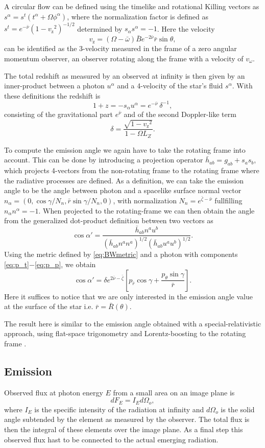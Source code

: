 \documentclass[iop, usenatbib]{emulateapj}
\newcommand{\be}{\begin{equation}}
\newcommand{\ee}{\end{equation}}
\newcommand{\rb}{\ensuremath{\bar{r}}}
\newcommand{\wb}{\ensuremath{\bar{\omega}}}
\newcommand{\nub}{\ensuremath{\bar{\nu}}}
\newcommand{\zetab}{\ensuremath{\bar{\zeta}}}
\newcommand{\Bb}{\ensuremath{\bar{B}}}
\newcommand{\vw}{\ensuremath{v_{\omega}}}
\newcommand{\vz}{\ensuremath{v_{\mathrm{z}}}}
\begin{document}
A circular flow can be defined using the timelike and rotational Killing vectors as $s^{\alpha} = s^t (t^{\alpha} + \Omega \phi^{\alpha})$, where the normalization factor is defined as $s^t = e^{-\nub} (1 - \vz^2)^{-1/2}$ determined by $s_{\alpha}s^{\alpha} = -1$.
Here the velocity 
\be
\vz = (\Omega - \wb) \Bb e^{-2\nub} \rb \sin\theta,
\ee
can be identified as the 3-velocity measured in the frame of a zero angular momentum observer, an observer rotating along the frame with a velocity of $\vw$.

The total redshift as measured by an observed at infinity is then given by an inner-product between a photon $u^{\alpha}$ and a 4-velocity of the star's fluid $s^{\alpha}$.
With these definitions the redshift is
\be
1 + z = -s_{\alpha} u^{\alpha} = e^{-\nub} ~\delta^{-1},
\ee
consisting of the gravitational part $e^{\nub}$ and of the second Doppler-like term
\be
\delta = \frac{\sqrt{1-\vz^2}}{1 - \Omega L_Z}.
\ee

To compute the emission angle we again have to take the rotating frame into account.  
This can be done by introducing a projection operator $\bar{h}_{ab} = g_{ab} + s_a s_b$, which projects 4-vectors from the non-rotating frame to the rotating frame where the radiative processes are defined.  
As a definition, we can take the emission angle to be the angle between photon and a spacelike surface normal vector $n_{\alpha} = (0, \cos\gamma/N_n, \rb \sin\gamma/N_n, 0)$, with normalization $N_n = e^{\zetab - \nub}$ fullfilling $n_{\alpha}n^{\alpha} = -1$.  
When projected to the rotating-frame we can then obtain the angle from the generalized dot-product definition between two vectors as
\be\label{eq:gen_angle}
\cos\alpha' = \frac{\bar{h}_{ab}n^a u^b}{(\bar{h}_{ab} n^a n^a)^{1/2} (\bar{h}_{ab} u^a u^b)^{1/2}}.
\ee
Using the metric defined by \eqref{eq:BWmetric} and a photon with components \eqref{eq:p_t}$-$\eqref{eq:p_p}, we obtain
\be
\cos\alpha' = \delta e^{2\nub-\zetab} \left[ p_{\rb} \cos\gamma + \frac{p_{\theta} \sin\gamma}{\rb} \right].
\ee
Here it suffices to notice that we are only interested in the emission angle value at the surface of the star i.e. $\rb = \bar{R}(\theta)$.

The result here is similar to the emission angle obtained with a special-relativistic approach, using flat-space trigonometry and Lorentz-boosting to the rotating frame \citep[see e.g.][]{PB06}.


\subsection{Emission}\label{sect:emission}
Observed flux at photon energy $E$ from a small area on an image plane is
\be
dF_E = I_E d\Omega_o,
\ee
where $I_E$ is the specific intensity of the radiation at infinity and $d\Omega_o$ is the solid angle subtended by the element as measured by the observer. 
The total flux is then the integral of these elements over the image plane. 
As a final step this observed flux hast to be connected to the actual emerging radiation.
\end{document}
